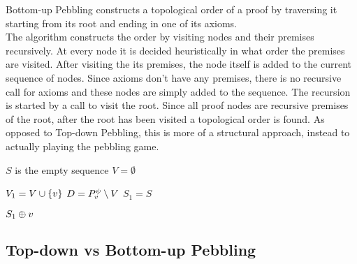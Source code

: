 \documentclass{llncs}
\begin{document}
Bottom-up Pebbling constructs a topological order of a proof by traversing it starting from its root and ending in one of its axioms.\\
The algorithm constructs the order by visiting nodes and their premises recursively. 
At every node it is decided heuristically in what order the premises are visited.
After visiting the its premises, the node itself is added to the current sequence of nodes.
Since axioms don't have any premises, there is no recursive call for axioms and these nodes are simply added to the sequence.
The recursion is started by a call to visit the root.
Since all proof nodes are recursive premises of the root, after the root has been visited a topological order is found.
As opposed to Top-down Pebbling, this is more of a structural approach, instead to actually playing the pebbling game.


\begin{algorithm}[h]
  \BlankLine

	$S$ is the empty sequence\;
	$V = \emptyset$\;
	\Return {}\;

  \caption[.]{}
  \label{algo:BUpebbling}
\end{algorithm}

\begin{algorithm}[h]
	
	$V_1 = V \cup \{v\}$\;
	$D = P_{v}^{\psi} \setminus V$\;
	$S_1 = S$
	
	
	\Return $S_1 \oplus v$\;
	
  \caption[.]{}
  \label{algo:visit}
\end{algorithm}

\subsection{Top-down vs Bottom-up Pebbling} %

\label{sec:TDvsBU}
\end{document}
